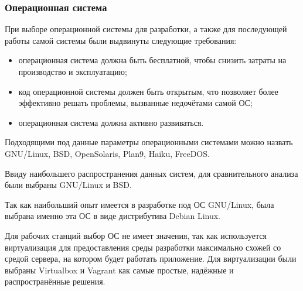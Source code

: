 \subsubsection{Операционная система}

При выборе операционной системы для разработки, а также для последующей работы самой системы были выдвинуты следующие требования:
\begin{itemize}
\item операционная система должна быть бесплатной, чтобы снизить затраты на производство и эксплуатацию;
\item код операционной системы должен быть открытым, что позволяет более эффективно решать проблемы, вызванные недочётами самой ОС;
\item операционная система должна активно развиваться.
\end{itemize}

Подходящими под данные параметры операционными системами можно назвать GNU/Linux, BSD, OpenSolaris, Plan9, Haiku, FreeDOS.

Ввиду наибольшего распространения данных систем, для сравнительного анализа были выбраны GNU/Linux и BSD.


Так как наибольший опыт имеется в разработке под ОС GNU/Linux, была выбрана именно эта ОС в виде дистрибутива Debian Linux.

Для рабочих станций выбор ОС не имеет значения, так как используется виртуализация для предоставления среды разработки максимально схожей со средой сервера, на котором будет работать приложение. Для виртуализации были выбраны Virtualbox и Vagrant как самые простые, надёжные и распространённые решения.

